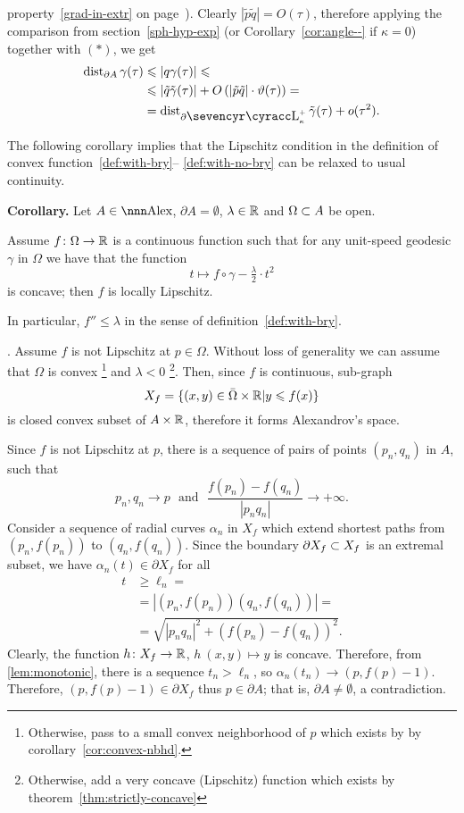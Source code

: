 \documentclass{article}
\begin{document}
property~\ref{grad-in-extr} on page~\pageref{grad-in-extr}).
Clearly $|\tilde p\tilde q|=O(\tau)$, therefore applying the comparison from
section~\ref{sph-hyp-exp} (or Corollary~\ref{cor:angle--} if $\kappa=0$)
together with $(*)$, we get
\begin{align*}
\dist_{\partial A} \gamma(\tau) 
&\le|q \gamma(\tau)|
\le
\\
&\le|\tilde q\tilde\gamma(\tau)|+O\l(|\tilde p\tilde q|\cdot\theta(\tau)\r)
=
\\
&=\dist_{\partial\Lobs_\kappa^+}\tilde\gamma(\tau)+o(\tau^2).
\end{align*}
\qedsf





The following corollary implies that the Lipschitz condition in the definition of
convex function~\ref{def:with-bry}-- \ref{def:with-no-bry} can be relaxed to usual continuity.

\begin{thm}{\bf Corollary.}\label{cor:cont-conv} Let $A\in\Alex$, $\partial A=\emptyset$,
$\lambda\in\mathbb{R}$ and $\Omega\subset A$ be open.

Assume $f\colon\Omega\to\mathbb{R}$ is a continuous function such that for any unit-speed geodesic $\gamma$ in $\Omega$ we have that the function
$$t\mapsto f\circ\gamma-\tfrac\lambda2{\cdot}t^2$$
is concave; then $f$ is locally Lipschitz.
 
In particular, $f''\le \lambda$ in the sense of
definition~\ref{def:with-bry}.
\end{thm}

\Proof. Assume $f$ is not Lipschitz at $p\in \Omega$.
Without loss of generality we can assume that $\Omega$ is
convex%
\footnote{Otherwise, pass to a small convex neighborhood of $p$ which
exists by by corollary~\ref{cor:convex-nbhd}.} 
and $\lambda<0$%
\footnote{Otherwise, add a very concave (Lipschitz) function which
exists by theorem~\ref{thm:strictly-concave}}.
Then, since $f$ is continuous, sub-graph
$$X_f=\{(x,y)\in \bar\Omega\times\mathbb{R}|y\leqslant f(x)\}$$
is closed convex subset of $A\times\mathbb{R}$, therefore it forms Alexandrov's
space. 

Since $f$ is not Lipschitz at $p$, there is a sequence of pairs of points
$(p_n,q_n)$ in $A$, such that 
$$p_n,q_n\to p\ \ \ \text{and}\ \ \  \frac{f(p_n)-f(q_n)}{|p_n
q_n|}\to+\infty.$$ 
Consider a sequence of radial curves $\alpha_n$ in $X_f$ which extend  shortest
paths from $(p_n,f(p_n))$ to $(q_n,f(q_n))$.
Since the boundary $\partial X_f\subset X_f$ is an extremal subset, we have $\alpha_n(t)\in
\partial X_f$ for all 
\begin{align*}
t
&\ge \ell_n
=
\\
&=|(p_n,f(p_n))(q_n,f(q_n))|
=
\\
&=\sqrt{|p_n
q_n|^2+(f(p_n)-f(q_n))^2}.
\end{align*}
Clearly, the function $h\colon X_f\to\mathbb{R}$, $h\:(x,y)\mapsto y$ is concave.
Therefore, from \ref{lem:monotonic}, there is a sequence $t_n>\ell_n$, so
$\alpha_n(t_n)\to (p,f(p)-1)$.
Therefore, $(p,f(p)-1)\in\partial X_f$ thus $p\in\partial A$;
that is, $\partial A\not=\emptyset$, a
contradiction.
\qeds
\end{document}
